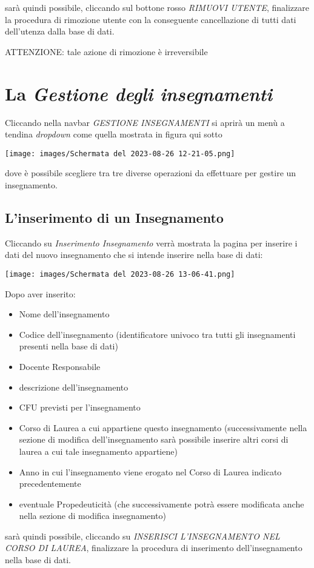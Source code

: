 \documentclass{article}
\newcommand{\alert}[0]{\textcolor{red}{\faExclamationCircle}}
\begin{document}
    sarà quindi possibile, cliccando sul bottone rosso \textit{RIMUOVI UTENTE}, finalizzare la procedura di rimozione utente con la conseguente cancellazione di tutti dati dell'utenza dalla base di dati.

    \alert ATTENZIONE: tale azione di rimozione è irreversibile

    \pagebreak

    \section{La \textit{Gestione degli insegnamenti}}

    Cliccando nella navbar \textit{GESTIONE INSEGNAMENTI} si aprirà un menù a tendina \textit{dropdown} come quella mostrata in figura qui sotto
    \begin{center}
        \texttt{[image: images/Schermata del 2023-08-26 12-21-05.png]}
    \end{center}
    dove è possibile scegliere tra tre diverse operazioni da effettuare per gestire un insegnamento.
    \subsection{L'inserimento di un Insegnamento}
    Cliccando su \textit{Inserimento Insegnamento} verrà mostrata la pagina per inserire i dati del nuovo insegnamento che si intende inserire nella base di dati:

    \begin{center}
        \texttt{[image: images/Schermata del 2023-08-26 13-06-41.png]}
    \end{center}
    Dopo aver inserito:
    \begin{itemize}
        \item Nome dell'insegnamento
        \item Codice dell'insegnamento (identificatore univoco tra tutti gli insegnamenti presenti nella base di dati)
        \item Docente Responsabile
        \item descrizione dell'insegnamento
        \item CFU previsti per l'insegnamento
        \item Corso di Laurea a cui appartiene questo insegnamento (successivamente nella sezione di modifica dell'insegnamento sarà possibile inserire altri corsi di laurea a cui tale insegnamento appartiene)
        \item Anno in cui l'insegnamento viene erogato nel Corso di Laurea indicato precedentemente
        \item eventuale Propedeuticità (che successivamente potrà essere modificata anche nella sezione di modifica insegnamento)
    \end{itemize}
    sarà quindi possibile, cliccando su \textit{INSERISCI L'INSEGNAMENTO NEL CORSO DI LAUREA}, finalizzare la procedura di inserimento dell'insegnamento nella base di dati.
\end{document}

